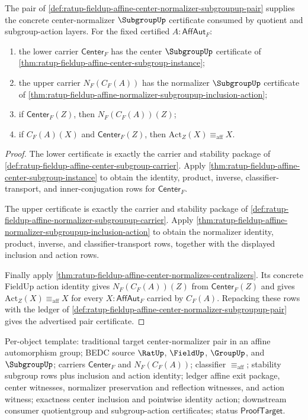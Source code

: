 \begin{theorem}
\label{thm:ratup-fieldup-affine-center-normalizer-subgroupup-pair-certificate}
The pair of
\autoref{def:ratup-fieldup-affine-center-normalizer-subgroupup-pair} supplies
the concrete center-normalizer $\SubgroupUp$ certificate consumed by quotient
and subgroup-action layers. For the fixed certified $A:\mathsf{AffAut}_F$:
\begin{enumerate}
\item the lower carrier $\mathsf{Center}_F$ has the center $\SubgroupUp$
certificate of
\autoref{thm:ratup-fieldup-affine-center-subgroup-instance};
\item the upper carrier $N_F(C_F(A))$ has the normalizer $\SubgroupUp$
certificate of
\autoref{thm:ratup-fieldup-affine-normalizer-subgroupup-inclusion-action};
\item if $\mathsf{Center}_F(Z)$, then $N_F(C_F(A))(Z)$;
\item if $C_F(A)(X)$ and $\mathsf{Center}_F(Z)$, then
$\mathrm{Act}_Z(X)\equiv_{\mathrm{aff}}X$.
\end{enumerate}
\end{theorem}
\begin{proof}
The lower certificate is exactly the carrier and stability package of
\autoref{def:ratup-fieldup-affine-center-subgroup-carrier}. Apply
\autoref{thm:ratup-fieldup-affine-center-subgroup-instance} to obtain the
identity, product, inverse, classifier-transport, and inner-conjugation rows for
$\mathsf{Center}_F$.

The upper certificate is exactly the carrier and stability package of
\autoref{def:ratup-fieldup-affine-normalizer-subgroupup-carrier}. Apply
\autoref{thm:ratup-fieldup-affine-normalizer-subgroupup-inclusion-action} to
obtain the normalizer identity, product, inverse, and classifier-transport
rows, together with the displayed inclusion and action rows.

Finally apply
\autoref{thm:ratup-fieldup-affine-center-normalizes-centralizers}. Its concrete
FieldUp action identity gives $N_F(C_F(A))(Z)$ from $\mathsf{Center}_F(Z)$ and
gives $\mathrm{Act}_Z(X)\equiv_{\mathrm{aff}}X$ for every
$X:\mathsf{AffAut}_F$ carried by $C_F(A)$. Repacking these rows with the ledger
of \autoref{def:ratup-fieldup-affine-center-normalizer-subgroupup-pair} gives
the advertised pair certificate.
\end{proof}

Per-object template: traditional target center-normalizer pair in an affine
automorphism group; BEDC source $\RatUp$, $\FieldUp$, $\GroupUp$, and
$\SubgroupUp$; carriers $\mathsf{Center}_F$ and $N_F(C_F(A))$; classifier
$\equiv_{\mathrm{aff}}$; stability subgroup rows plus inclusion and action
identity; ledger affine exit package, center witnesses, normalizer preservation
and reflection witnesses, and action witness; exactness center inclusion and
pointwise identity action; downstream consumer quotientgroup and subgroup-action
certificates; status $\mathsf{ProofTarget}$.

